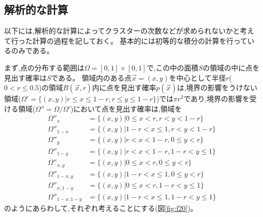 \subsection{解析的な計算}
以下には,解析的な計算によってクラスターの次数などが求められないかと考えて行った計算の過程を記しておく。
基本的には初等的な積分の計算を行っているのみである。

まず,点の分布する範囲は$\Omega = [0,1]\times [0,1]$で,この中の面積$S$の領域の中に点を見出す確率は$S$である。
領域内のある点$\vec x=(x,y)$を中心として半径$r$($0 < r \le 0.5$)の領域$B(\vec x, r)$内に点を見出す確率$p(\vec x)$は,境界の影響をうけない領域($\Omega ' = \{(x,y) | r \le x \le 1-r, r \le y \le 1-r \}$)では$\pi r^{2}$であり,境界の影響を受ける領域($\Omega'' = \Omega / \Omega'$)において点を見出す確率は,領域を
\begin{align}
\Omega''_{x} &= \{(x,y) | 0 \le x < r, r< y < 1-r\}\nonumber \\
\Omega''_{1-x} &= \{(x,y) | 1-r < x \le 1, r< y < 1-r\}\nonumber \\
\Omega''_{y} &= \{(x,y) | r < x < 1-r, 0 \le y < r\}\nonumber \\
\Omega''_{1-y} &= \{(x,y) | r < x < 1-r, 1-r < y \le 1\}\nonumber \\
\Omega''_{x,y} &= \{(x,y) | 0 \le x < r, 0 \le y < r\}\nonumber \\
\Omega''_{1-x,y} &= \{(x,y) | 1-r < x \le 1, 0 \le y < r\}\nonumber \\
\Omega''_{x,1-y} &= \{(x,y) | 0 \le x < r, 1-r < y \le 1\}\nonumber \\
\Omega''_{1-x, 1-y} &= \{(x,y) | 1-r < x \le 1, 1-r < y \le 1\}\nonumber
\end{align}
のようにあらわして,それぞれ考えることにする(図\ref{fig:f20})。

